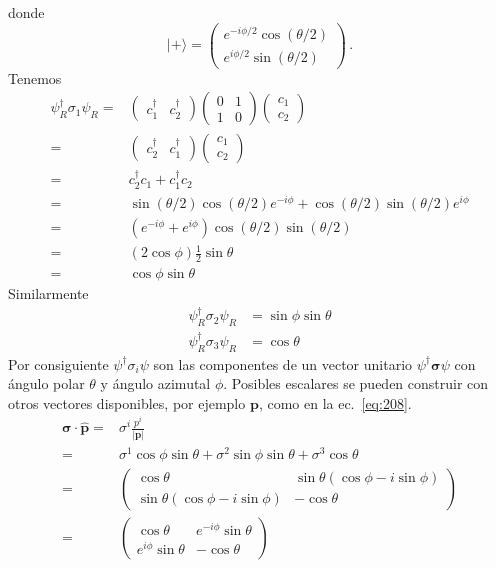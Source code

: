donde
\begin{equation}
|+\rangle=  \begin{pmatrix}
  e^{-i \phi/2}\cos(\theta/2)\\
  e^{i \phi/2}\sin(\theta/2)
  \end{pmatrix}\,.
\end{equation}
Tenemos
\begin{align}
  \psi^\dagger_R \sigma_1 \psi_R=&
  \begin{pmatrix}
   c_1^\dagger & c_2^\dagger 
  \end{pmatrix}
  \begin{pmatrix}
    0 & 1\\
    1&0
  \end{pmatrix}
  \begin{pmatrix}
    c_1\\
    c_2
  \end{pmatrix}\nonumber\\
  =&  \begin{pmatrix}
    c_2^\dagger & c_1^\dagger
  \end{pmatrix}
  \begin{pmatrix}
    c_1\\
    c_2
  \end{pmatrix}\nonumber\\
  =&  c_2^\dagger c_1 + c_1^\dagger c_2\nonumber\\
  =&  \sin(\theta/2)\cos(\theta/2)e^{-i\phi}+\cos(\theta/2)\sin(\theta/2)e^{i\phi}\nonumber\\
  =&  (e^{-i\phi}+e^{i\phi})\cos(\theta/2)\sin(\theta/2)\nonumber\\
  =&  (2\cos\phi)\frac{1}{2}\sin\theta\nonumber\\
  =&  \cos\phi\sin\theta
\end{align}
Similarmente
\begin{align}
  \psi^\dagger_R \sigma_2\psi_R&=\sin\phi\sin\theta\nonumber\\
  \psi^\dagger_R \sigma_3\psi_R&=\cos\theta
\end{align}
Por consiguiente $\psi^\dagger \sigma_i\psi$ son las componentes de un vector unitario $\psi^\dagger \boldsymbol{\sigma}\psi$ con \'angulo polar $\theta$ y \'angulo azimutal $\phi$. Posibles escalares se pueden construir con otros vectores disponibles, por ejemplo $\mathbf{p}$, como en la ec.~\eqref{eq:208}.
\begin{align}
  \boldsymbol{\sigma}\cdot\hat{\mathbf{p}}=&\sigma^i \frac{p^i}{|\mathbf{p}|}\nonumber\\
  =&\sigma^1\cos\phi\sin\theta+\sigma^2\sin\phi\sin\theta+\sigma^3\cos\theta\nonumber\\
  =&\begin{pmatrix}
    \cos\theta&\sin\theta(\cos\phi-i\sin\phi)\\
    \sin\theta(\cos\phi-i\sin\phi)&-\cos\theta
  \end{pmatrix}\nonumber\\
  =&\begin{pmatrix}
    \cos\theta&e^{-i\phi}\sin\theta\\
    e^{i\phi}\sin\theta&-\cos\theta
  \end{pmatrix}
\end{align}
